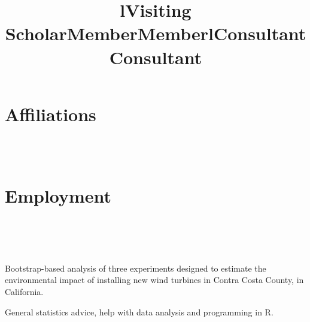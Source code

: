 \documentclass[overlapped,line,letterpaper]{res}
\begin{document}
\begin{resume}
\section{\bf Affiliations}


\begin{format}
\title{l}\\
\\
\end{format}

\title{Visiting Scholar}
\begin{position}
\end{position}

\title{Member}
\begin{position}
\end{position}

\title{Member}
\begin{position}
\end{position}



\section{\bf Employment}

\begin{format}
\title{l}\\
\\
\body\\
\end{format}

\title{Consultant}
\begin{position}
    Bootstrap-based analysis of three experiments designed to estimate
    the environmental impact of installing new wind turbines in
    Contra Costa County, in California.
\end{position}

\title{Consultant}
\begin{position}
    General statistics advice, help with data analysis and programming in R.
\end{position}


\end{resume}
\end{document}
